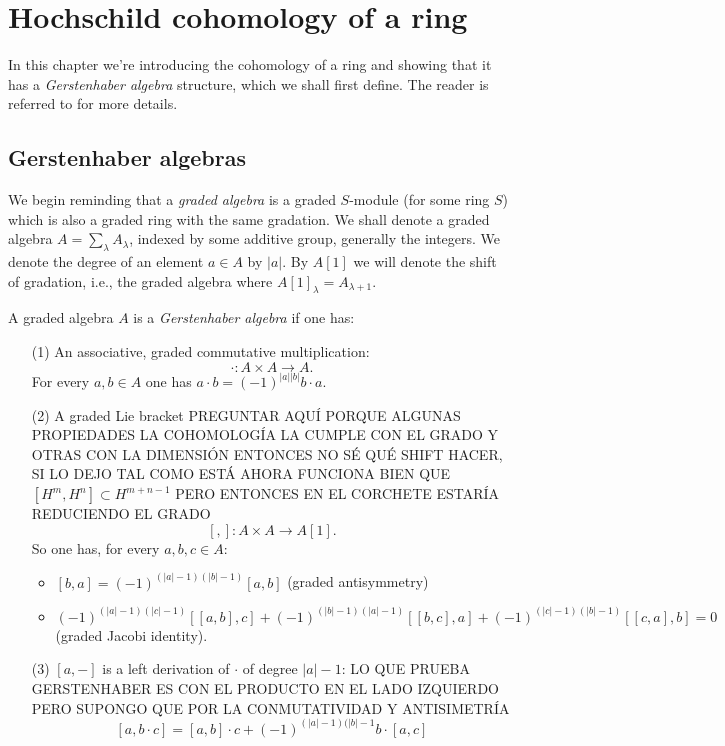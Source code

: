 \documentclass[TFM.tex]{subfiles}
\begin{document}
\chapter{Hochschild cohomology of a ring}

In this chapter we're introducing the cohomology of a ring and showing that it has a \emph{Gerstenhaber algebra} structure, which we shall first define. The reader is referred to \cite{Gerstenhaber} for more details.  


\section{Gerstenhaber algebras}

We begin reminding that a \emph{graded algebra} is a graded $S$-module (for some ring $S$) which is also a graded ring with the same gradation. We shall denote a graded algebra $A=\sum_\lambda A_\lambda$, indexed by some additive group, generally the integers. We denote the degree of an element $a\in A$ by $|a|$. By $A[1]$ we will denote the shift of gradation, i.e., the graded algebra where $A[1]_\lambda=A_{\lambda+1}$. 


\begin{defi}
A graded algebra $A$ is a \emph{Gerstenhaber algebra} if one has:
\begin{enumerate}
\item[(1)] An associative, graded commutative multiplication:
\[
\cdot: A\times A\to A.
\]
For every $a,b\in A$ one has $a\cdot b=(-1)^{|a||b|}b\cdot a$.

\item[(2)] A graded Lie bracket PREGUNTAR AQUÍ PORQUE ALGUNAS PROPIEDADES LA COHOMOLOGÍA LA CUMPLE CON EL GRADO Y OTRAS CON LA DIMENSIÓN ENTONCES NO SÉ QUÉ SHIFT HACER, SI LO DEJO TAL COMO ESTÁ AHORA FUNCIONA BIEN QUE $[H^{m}, H^{n}]\subset H^{m+n-1}$ PERO ENTONCES EN EL CORCHETE ESTARÍA REDUCIENDO EL GRADO
\[
[,]:A\times A\to A[1].
\]
So one has, for every $a,b,c\in A$:
\begin{itemize}
\item $[b,a]=(-1)^{(|a|-1)(|b|-1)}[a,b]$ (graded antisymmetry)
\item $(-1)^{(|a|-1)(|c|-1)}[[a,b],c]+(-1)^{(|b|-1)(|a|-1)}[[b,c],a]+(-1)^{(|c|-1)(|b|-1)}[[c,a],b]=0$ (graded Jacobi identity). 
\end{itemize}
\item[(3)]  $[a,−]$ is a left derivation of $\cdot$ of degree $|a|-1$: LO QUE PRUEBA GERSTENHABER ES CON EL PRODUCTO EN EL LADO IZQUIERDO PERO SUPONGO QUE POR LA CONMUTATIVIDAD Y ANTISIMETRÍA
\[
[a,b\cdot c]=[a,b]\cdot c+(-1)^{(|a|-1)(|b|-1}b\cdot [a,c]
\]
\end{enumerate}
\end{defi}
\end{document}
